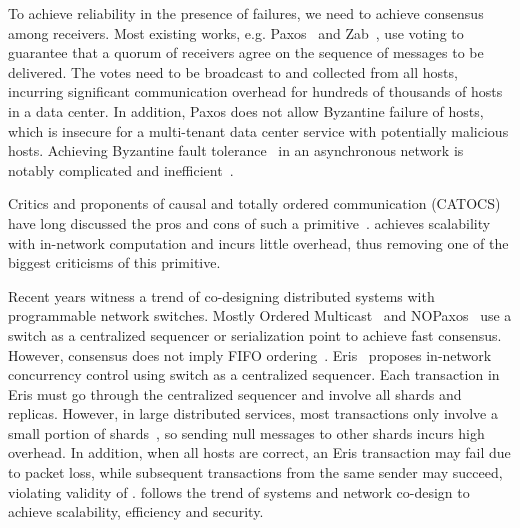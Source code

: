 To achieve reliability in the presence of failures, we need to achieve consensus among receivers.
Most existing works, e.g. Paxos~\cite{lamport1998part} and Zab~\cite{junqueira2011zab}, use voting to guarantee that a quorum of receivers agree on the sequence of messages to be delivered.
The votes need to be broadcast to and collected from all hosts, incurring significant communication overhead for hundreds of thousands of hosts in a data center.
In addition, Paxos does not allow Byzantine failure of hosts, which is insecure for a multi-tenant data center service with potentially malicious hosts.
Achieving Byzantine fault tolerance~\cite{lamport1982byzantine,castro1999practical,kotla2007zyzzyva} in an asynchronous network is notably complicated and inefficient~\cite{mickens2014saddest}.

Critics and proponents of causal and totally ordered communication (CATOCS) have long discussed the pros and cons of such a primitive~\cite{cheriton1994understanding,birman1994response,van1994bother}. 
\sys achieves scalability with in-network computation and incurs little overhead, thus removing one of the biggest criticisms of this primitive.

Recent years witness a trend of co-designing distributed systems with programmable network switches.
Mostly Ordered Multicast~\cite{ports2015designing} and NOPaxos~\cite{li2016just} use a switch as a centralized sequencer or serialization point to achieve fast consensus.
However, consensus does not imply FIFO ordering~\cite{junqueira2011zab}.
Eris~\cite{eris} proposes in-network concurrency control using switch as a centralized sequencer.
Each transaction in Eris must go through the centralized sequencer and involve all shards and replicas.
However, in large distributed services, most transactions only involve a small portion of shards~\cite{nishtala2013scaling}, so sending null messages to other shards incurs high overhead.
In addition, when all hosts are correct, an Eris transaction may fail due to packet loss, while subsequent transactions from the same sender may succeed, violating validity of \sys.
\sys follows the trend of systems and network co-design to achieve scalability, efficiency and security.



